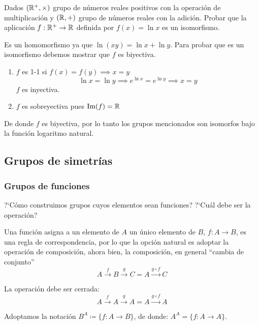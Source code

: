 \begin{fmd-example}
	Dados $(\mathbb{R}^{+}, \times)$ grupo de números reales positivos con la operación de multiplicación y $(\mathbb{R}, +)$ grupo de números reales con la adición. Probar que la aplicación $f: \mathbb{R}^{+} \rightarrow \mathbb{R}$ definida por $f(x) = \ln x$ es un isomorfismo.
	
	Es un homomorfismo ya que $\ln(xy) = \ln x + \ln y$. Para probar que es un isomorfismo debemos mostrar que $f$ es biyectiva.
	
	\begin{enumerate}[label=\alph*)]
		\item $f$ es 1-1 si $f(x) = f(y) \implies x = y$
		\[ \ln x = \ln y \implies e^{\ln x} = e^{\ln y} \implies x = y \]
		$f$ es inyectiva.
		
		\item $f$ es sobreyectiva pues $\mbox{Im}(f) = \mathbb{R}$
		
		\begin{figure}[H]
			\centering
			
		\end{figure}
	\end{enumerate}
	De donde $f$ es biyectiva, por lo tanto los grupos mencionados son isomorfos bajo la función logaritmo natural.
\end{fmd-example}

\subsection{Grupos de simetrías}

\subsubsection{Grupos de funciones}
?`Cómo construimos grupos cuyos elementos sean funciones? ?`Cuál debe ser la operación?

Una función asigna a un elemento de $A$ un único elemento de $B$, $f: A \rightarrow B$, es una regla de correspondencia, por lo que la opción natural es adoptar la operación de composición, ahora bien, la composición, en general ``cambia de conjunto''  \[A \xrightarrow{f} B \xrightarrow{g} C = A \xrightarrow{g \circ f} C\]

La operación debe ser cerrada:
\[A \xrightarrow{f} A \xrightarrow{g} A = A \xrightarrow{g \circ f} A\]

Adoptamos la notación $B^A \coloneqq \{ f: A \rightarrow B \}$, de donde: $A^A = \{ f: A \rightarrow A \}$.

